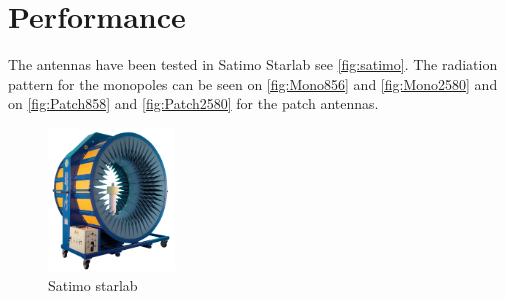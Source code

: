 




\setlength\cftaftertoctitleskip{2pt}
\setlength\cftafterloftitleskip{6pt}
\setlength\cftafterlottitleskip{6pt}
\captionsetup{belowskip=-1.5em}


\fancyhead[RE,LO]{}
\fancyhead[RO,LE]{\small\nouppercase\leftmark} %




\chapter{Performance}

The antennas have been tested in Satimo Starlab see \autoref{fig:satimo}. 
The radiation pattern for the monopoles can be seen on \autoref{fig:Mono856} and \autoref{fig:Mono2580} and on \autoref{fig:Patch858} and \autoref{fig:Patch2580} for the patch antennas.

\begin{figure}[H]
\centering
\includegraphics[width=0.3\textwidth]{figure/starlab.png}
\caption{Satimo starlab}
\label{fig:satimo}
\end{figure}




